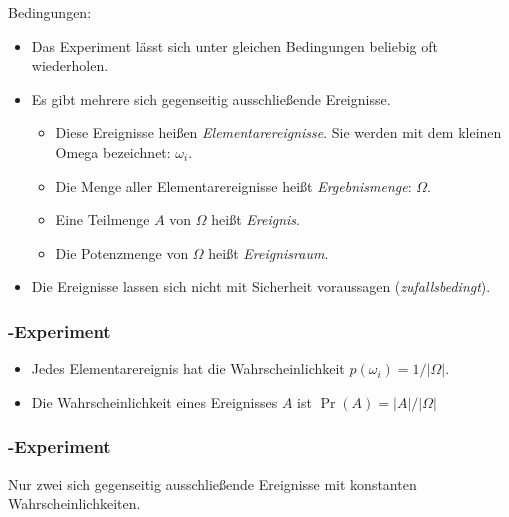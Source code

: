 Bedingungen:
\begin{itemize}
  \item Das Experiment lässt sich unter gleichen Bedingungen beliebig oft wiederholen.
  \item Es gibt mehrere sich gegenseitig ausschließende Ereignisse.
	\begin{itemize}
	  \item Diese Ereignisse heißen \emph{Elementarereignisse}.
		Sie werden mit dem kleinen Omega bezeichnet: $\omega_{i}$.
	  \item Die Menge aller Elementarereignisse heißt \emph{Ergebnismenge}: $\Omega$.
	  \item Eine Teilmenge $A$ von $\Omega$ heißt \emph{Ereignis}.
	  \item Die Potenzmenge von $\Omega$ heißt \emph{Ereignisraum}.
	\end{itemize}
  \item Die Ereignisse lassen sich nicht mit Sicherheit voraussagen (\emph{zufallsbedingt}).
\end{itemize}

\subsubsection{\protect{}-Experiment}

\begin{itemize}
  \item Jedes Elementarereignis hat die Wahrscheinlichkeit $p(\omega_i) = 1 / \lvert\Omega\rvert$.
  \item Die Wahrscheinlichkeit eines Ereignisses $A$ ist $\Pr(A) = \lvert A \rvert / \lvert\Omega\rvert$
\end{itemize}

\subsubsection{\protect{}-Experiment}

Nur zwei sich gegenseitig ausschließende Ereignisse mit konstanten Wahrscheinlichkeiten.


